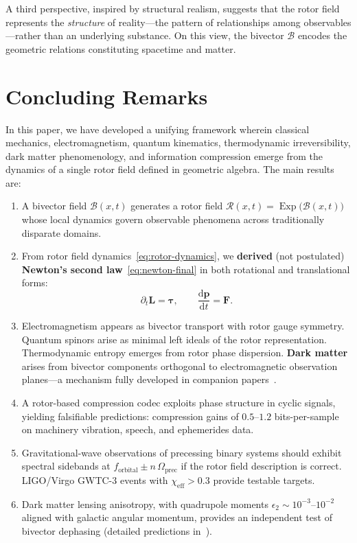 \documentclass[11pt,a4paper]{article}
\newcommand{\Exp}{\operatorname{Exp}}
\newcommand{\Rotor}{\mathcal{R}}
\newcommand{\Biv}{\mathcal{B}}
\theoremstyle{definition}
\theoremstyle{plain}
\theoremstyle{remark}
\begin{document}
A third perspective, inspired by structural realism, suggests that the rotor field represents the \emph{structure} of reality---the pattern of relationships among observables---rather than an underlying substance. On this view, the bivector $\Biv$ encodes the geometric relations constituting spacetime and matter.

\vspace{1em}

\section{Concluding Remarks}\label{sec:conclusion}

In this paper, we have developed a unifying framework wherein classical mechanics, electromagnetism, quantum kinematics, thermodynamic irreversibility, dark matter phenomenology, and information compression emerge from the dynamics of a single rotor field defined in geometric algebra. The main results are:

\begin{enumerate}
  \item A bivector field $\Biv(x,t)$ generates a rotor field $\Rotor(x,t)=\Exp\!\big(\Biv(x,t)\big)$ whose local dynamics govern observable phenomena across traditionally disparate domains.
  \item From rotor field dynamics~\eqref{eq:rotor-dynamics}, we \textbf{derived} (not postulated) \textbf{Newton's second law}~\eqref{eq:newton-final} in both rotational and translational forms:
  \begin{equation*}
  \partial_t \bm{L} = \bm{\tau}, \qquad \frac{\mathrm{d}\mathbf{p}}{\mathrm{d}t} = \mathbf{F}.
  \end{equation*}
  \item Electromagnetism appears as bivector transport with rotor gauge symmetry. Quantum spinors arise as minimal left ideals of the rotor representation. Thermodynamic entropy emerges from rotor phase dispersion. \textbf{Dark matter} arises from bivector components orthogonal to electromagnetic observation planes---a mechanism fully developed in companion papers~\cite{DarkMatterPaper}.
  \item A rotor-based compression codec exploits phase structure in cyclic signals, yielding falsifiable predictions: compression gains of $0.5$--$1.2$ bits-per-sample on machinery vibration, speech, and ephemerides data.
  \item Gravitational-wave observations of precessing binary systems should exhibit spectral sidebands at $f_{\text{orbital}} \pm n\,\Omega_{\text{prec}}$ if the rotor field description is correct. LIGO/Virgo GWTC-3 events with $\chi_{\text{eff}} > 0.3$ provide testable targets.
  \item Dark matter lensing anisotropy, with quadrupole moments $\epsilon_2 \sim 10^{-3}$--$10^{-2}$ aligned with galactic angular momentum, provides an independent test of bivector dephasing (detailed predictions in~\cite{DarkMatterPaper}).
\end{enumerate}
\end{document}
